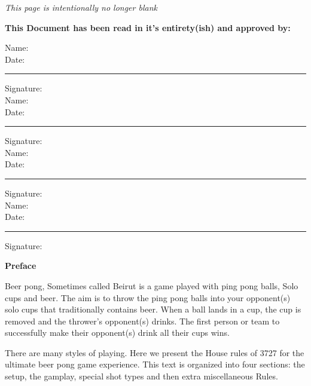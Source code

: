 \documentclass[11pt, oneside,letterpaper]{article}
\begin{document}
	

	\newpage\thispagestyle{empty}
	\emph{This page is intentionally no longer blank}

\newpage\thispagestyle{empty}
\textbf{This Document has been read in it's entirety(ish) and approved by: }

\vspace{1.5cm}
\noindent Name: \hrulefill \\[1cm]
Date: \rule{1.5in}{0.5pt}
\noindent Signature: \hrulefill \\[1.5cm]

\noindent Name: \hrulefill \\[1cm]
Date: \rule{1.5in}{0.5pt}
\noindent Signature: \hrulefill \\[1.5cm]

\noindent Name: \hrulefill \\[1cm]
Date: \rule{1.5in}{0.5pt}
\noindent Signature: \hrulefill \\[1.5cm]

\noindent Name: \hrulefill \\[1cm]
Date: \rule{1.5in}{0.5pt}
\noindent Signature: \hrulefill 


	\newpage\thispagestyle{empty}
	\tableofcontents \thispagestyle{empty}
	\newpage

	\setcounter{page}{1} %
	\begin{center}
		\textbf{Preface} \\
	\end{center}
		Beer pong, Sometimes called Beirut is a game played with ping pong balls, Solo cups and beer.
        The aim is to throw the ping pong balls into your opponent(s) solo cups that traditionally contains beer.
        When a ball lands in a cup, the cup is removed and the thrower's opponent(s) drinks.
        The first person or team to successfully make their opponent(s) drink all their cups wins.

		There are many styles of playing.
        Here we present the House rules of 3727 for the ultimate beer pong game experience. 
        This text is organized into four sections: the setup, the gamplay, special shot types and then extra miscellaneous Rules.


		




\end{document}
